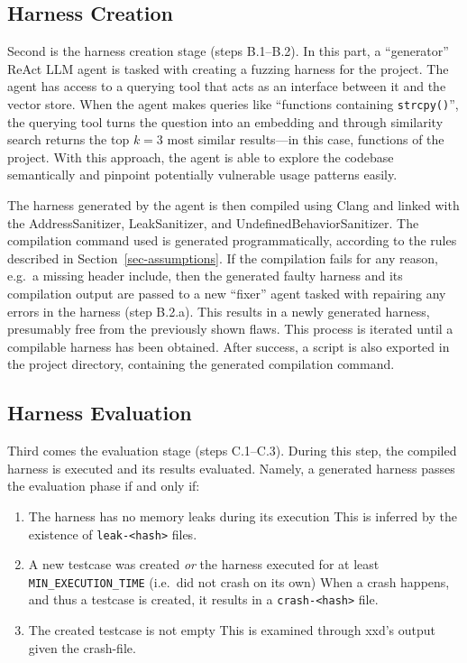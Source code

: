 \documentclass[
  a4paper,
  DIV=11,
  numbers=noendperiod]{scrreprt}
\providecommand{\tightlist}{%
  \setlength{\itemsep}{0pt}\setlength{\parskip}{0pt}}
\theoremstyle{definition}
\theoremstyle{remark}
\begin{document}
\subsection{Harness Creation}\label{sec-creation}

Second is the harness creation stage (steps B.1--B.2). In this part, a
``generator'' ReAct LLM agent is tasked with creating a fuzzing harness
for the project. The agent has access to a querying tool that acts as an
interface between it and the vector store. When the agent makes queries
like ``functions containing \texttt{strcpy()}'', the querying tool turns
the question into an embedding and through similarity search returns the
top \(k=3\) most similar results---in this case, functions of the
project. With this approach, the agent is able to explore the codebase
semantically and pinpoint potentially vulnerable usage patterns easily.

The harness generated by the agent is then compiled using Clang and
linked with the AddressSanitizer, LeakSanitizer, and
UndefinedBehaviorSanitizer. The compilation command used is generated
programmatically, according to the rules described in
Section~\ref{sec-assumptions}. If the compilation fails for any reason,
e.g.~a missing header include, then the generated faulty harness and its
compilation output are passed to a new ``fixer'' agent tasked with
repairing any errors in the harness (step B.2.a). This results in a
newly generated harness, presumably free from the previously shown
flaws. This process is iterated until a compilable harness has been
obtained. After success, a script is also exported in the project
directory, containing the generated compilation command.

\subsection{Harness Evaluation}\label{sec-evaluation}

Third comes the evaluation stage (steps C.1--C.3). During this step, the
compiled harness is executed and its results evaluated. Namely, a
generated harness passes the evaluation phase if and only if:

\begin{enumerate}
\def\labelenumi{\arabic{enumi}.}
\tightlist
\item
  The harness has no memory leaks during its execution This is inferred
  by the existence of \texttt{leak-\textless{}hash\textgreater{}} files.
\item
  A new testcase was created \emph{or} the harness executed for at least
  \texttt{MIN\_EXECUTION\_TIME} (i.e.~did not crash on its own) When a
  crash happens, and thus a testcase is created, it results in a
  \texttt{crash-\textless{}hash\textgreater{}} file.
\item
  The created testcase is not empty This is examined through xxd's
  output given the crash-file.
\end{enumerate}
\end{document}
